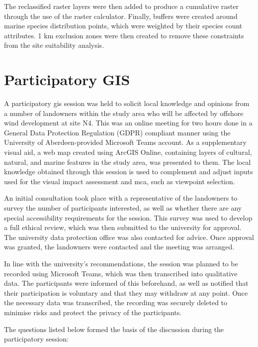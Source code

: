 The reclassified raster layers were then added to produce a cumulative raster through the use of the raster calculator. Finally, buffers were created around marine species distribution points, which were weighted by their species count attributes. 1 km exclusion zones were then created to remove these constraints from the site suitability analysis.

\section{Participatory GIS}

A participatory \gls{gis} session was held to solicit local knowledge and opinions from a number of landowners within the study area who will be affected by offshore wind development at site N4. This was an online meeting for two hours done in a General Data Protection Regulation (GDPR) compliant manner using the University of Aberdeen-provided Microsoft Teams account. As a supplementary visual aid, a web map created using ArcGIS Online, containing layers of cultural, natural, and marine features in the study area, was presented to them. The local knowledge obtained through this session is used to complement and adjust inputs used for the visual impact assessment and \gls{mca}, such as viewpoint selection.

An initial consultation took place with a representative of the landowners to survey the number of participants interested, as well as whether there are any special accessibility requirements for the session. This survey was used to develop a full ethical review, which was then submitted to the university for approval. The university data protection office was also contacted for advice. Once approval was granted, the landowners were contacted and the meeting was arranged.

In line with the university's recommendations, the session was planned to be recorded using Microsoft Teams, which was then transcribed into qualitative data. The participants were informed of this beforehand, as well as notified that their participation is voluntary and that they may withdraw at any point. Once the necessary data was transcribed, the recording was securely deleted to minimise risks and protect the privacy of the participants.

The questions listed below formed the basis of the discussion during the participatory session:

